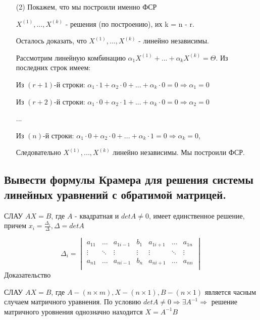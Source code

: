 \begin{enumerate}
    \vspace*{15pt}

    \item[(2)] Покажем, что мы построили именно ФСР

    $X^{(1)}, ..., X^{(k)}$ - решения (по построению), их k = n - r.
    
    Осталось доказать, что $X^{(1)}, ..., X^{(k)}$ - линейно независимы.

    Рассмотрим линейную комбинацию $\alpha_1X^{(1)} + ... + \alpha_kX^{(k)} = \Theta$. Из последних строк имеем:

    Из $(r+1)$-й строки: $\alpha_1\cdot 1 + \alpha_2\cdot 0 + ... + \alpha_k\cdot 0 = 0 \Rightarrow \alpha_1 = 0$

    Из $(r+2)$-й строки: $\alpha_1\cdot 0 + \alpha_2\cdot 1 + ... + \alpha_k\cdot 0 = 0 \Rightarrow \alpha_2 = 0$

    ...

    Из $(n)$-й строки: $\alpha_1\cdot 0 + \alpha_2\cdot 0 + ... + \alpha_k\cdot 1 = 0 \Rightarrow \alpha_k = 0$,

    Следовательно $X^{(1)}, ..., X^{(k)}$ линейно независимы. Мы построили ФСР.
\end{enumerate}

\ep

\subsection{Вывести формулы Крамера для решения системы линейных уравнений с обратимой матрицей.}

СЛАУ $AX = B$, где $A$ - квадратная и $detA \ne 0$, имеет единственное решение, причем $x_i = \frac{\Delta_i}{\Delta}, \Delta = detA$

$$
\Delta_i = 
\begin{vmatrix}
    a_{11}&\ldots&a_{1i-1}&b_1&a_{1i+1}&\ldots&a_{1n}\\
    \vdots&\ddots&\vdots&\vdots&\vdots&\ddots&\vdots\\
    a_{n1}&\ldots&a_{ni-1}&b_n&a_{ni+1}&\ldots&a_{nn}\\
\end{vmatrix}
$$
Доказательство

СЛАУ $AX = B$, где $A - (n\times m), X - (n \times 1), B - (n \times 1)$ является часным случаем матричного уравнения. По условию $detA \ne 0 \Rightarrow \exists A^{-1} \Rightarrow$ решение матричного уровнения однозначно находится $X = A^{-1}B$

